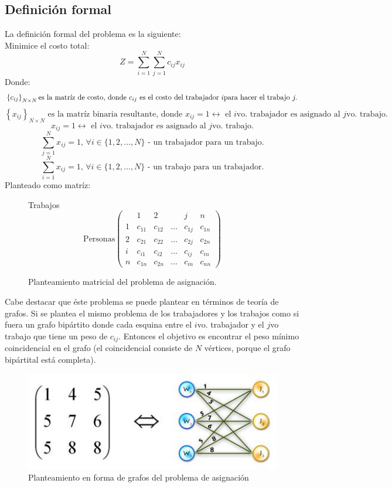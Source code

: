 \documentclass[letterpaper, 12pt]{article}
\begin{document}
    \subsection{Definición formal}
    La definición formal del problema es la siguiente:\\\newline
    Minimice el costo total:
    \[Z=\sum_{i=1}^{N}\sum_{j=1}^{N}c_{ij}x_{ij}\]
    Donde:
    \[\left\{c_{ij}\right\}_{N\times N} \text{ \\es la matríz de costo, donde }c_{ij} \text{ es el costo del trabajador }i \text{para hacer el trabajo }j.\]
    \[\left\{x_{ij}\right\}_{N\times N} \text{ es la matríz binaria resultante, donde }x_{ij}=1\leftrightarrow \text{ el }i\text{vo. trabajador es asignado al }j\text{vo. trabajo.}\]
    \[x_{ij}=1\leftrightarrow \text{ el }i\text{vo. trabajador es asignado al }j\text{vo. trabajo.}\]
    \[\sum_{j=1}^{N}x_{ij}=1,\,\forall i\in\{1,2,...,N\} \text{ - un trabajador para un trabajo.}\]
    \[\sum_{i=1}^{N}x_{ij}=1,\,\forall i\in\{1,2,...,N\} \text{ - un trabajo para un trabajador.}\]
    Planteado como matríz:
    \begin{figure}[H]
        \centering
            Trabajos
            \[\text{Personas}\begin{pmatrix}
                &1&2& &j&n\\
               1&c_{11}&c_{12}&\dots&c_{1j}&c_{1n}\\
               2&c_{21}&c_{22}&\dots&c_{2j}&c_{2n}\\
               i&c_{i1}&c_{i2}&\dots&c_{ij}&c_{in}\\
               n&c_{1n}&c_{2n}&\dots&c_{in}&c_{nn}
            \end{pmatrix}\]
            \caption{Planteamiento matricial del problema de asignación.}
    \end{figure}
    Cabe destacar que éste problema se puede plantear en términos de teoría de grafos. Si se plantea el mismo problema de los trabajadores y los trabajos como si fuera un grafo bipártito donde cada esquina entre el
    \(i\)vo. trabajador y el \(j\)vo trabajo que tiene un peso de \(c_{ij}.\) Entonces el objetivo es encontrar el peso mínimo coincidencial en el grafo (el coincidencial consiste de \(N\) vértices, porque el grafo bipártital está completa).
    \begin{figure}[H]
        \centering
        \includegraphics[width=12cm]{grafo.jpg}
        \caption{Planteamiento en forma de grafos del problema de asignación}
    \end{figure}
\end{document}
